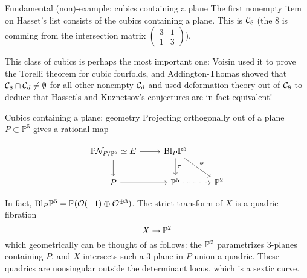\documentclass[10pt]{beamer}
\begin{document}
    
\begin{comment}
\begin{frame}{Why is the Kuznetsov component CY2?}
    
\end{frame}

\begin{frame}{Fundamental (Non)-example: cubics containing a plane}
    The case $d=8$ in Hassett's list obeys condition $*$ but not $**$. In fact, generically, $$\mathcal{A}_X\simeq \mathcal{D}(S,\alpha)$$is the derived category of a twisted K3 surface! When the Brauer class $\alpha \in H^2 (S, \mathcal{O}_S^\times)$ vanishes, the cubic fourfold $X$ is in the intersection $\mathcal{C}_8\cap \mathcal{C}_d$ for some $d$ in $**$, which is consistent with te rationality predictions.
\end{frame}

\end{comment}

\begin{frame}{Fundamental (non)-example: cubics containing a plane}
    The first nonempty item on Hasset's list consists of the cubics containing a plane. This is $\calC_8$ (the $8$ is comming from the intersection matrix $\begin{pmatrix}
        3 & 1 \\
        1 & 3
    \end{pmatrix}$). 
    \newline
    
    \pause This class of cubics is perhaps the most important one: Voisin used it to prove the Torelli theorem for cubic fourfolds, and Addington-Thomas showed that $\calC_8 \cap \calC_d \neq \emptyset$ for all other nonempty $\calC_d$ and used deformation theory out of $\calC_8$ to deduce that Hasset's and Kuznetsov's conjectures are in fact equivalent!
    
\end{frame}

\begin{frame}[fragile]{Cubics containing a plane: geometry}
    Projecting orthogonally out of a plane $P\subset \mathbb{P}^5$ gives a rational map 


        \[\begin{tikzcd}
            \P \mathcal{N}_{P/ \mathbb{P}^5} \simeq E \arrow[d] \arrow[r] & \mathrm{Bl}_P \mathbb{P}^5 \arrow[d, "\tau"] \arrow[rd, "\phi"] &      \\
            P \arrow[r]                             & \mathbb{P}^5 \arrow[r, dotted]                          & \mathbb{P}^2
        \end{tikzcd}\]

        In fact, $\mathrm{Bl}_P \P^5 = \P (\O(-1)\oplus \O^{\oplus 3})$. \pause The strict transform of $X$ is a quadric fibration $$\tilde{X}\rightarrow \P^2$$which geometrically can be thought of as follows: the $\P^2$ parametrizes 3-planes containing $P$, and $X$ intersects such a 3-plane in $P$ union a quadric. These quadrics are nonsingular outside the determinant locus, which is a sextic curve.
                      
\end{frame}
\end{document}
